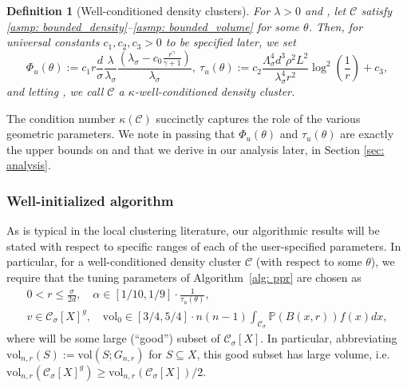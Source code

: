 \documentclass[11pt,twoside]{article}
\newtheorem{definition}{Definition}
\newcommand{\vol}{\mathrm{vol}}
\newcommand{\1}{\mathbf{1}}
\newcommand{\Phibf}{\Phi_{u}}
\newcommand{\taubf}{\tau_{u}}
\newcommand{\Xbf}{X}             %
\newcommand{\Pbb}{\mathbb{P}}
\newcommand{\Cbb}{\mathbb{C}}
\newcommand{\Cset}{\mathcal{C}}
\newcommand{\Csig}{\Cset_{\sigma}}
\begin{document}
\begin{definition}[Well-conditioned density clusters]
  For $\lambda > 0$ and \smash{$\Cset \in \Cbb_f(\lambda)$}, let $\Cset$ satisfy 
  \ref{asmp: bounded_density}--\ref{asmp: bounded_volume} for some
  $\theta$. Then, for universal constants $c_1, c_2, c_3 > 0$ to be specified
  later, we set 
  \begin{equation}
    \label{eqn: condition_number_1}
    \Phibf(\theta) 
    := c_1 r \frac{d}{\sigma} \frac{\lambda}{\lambda_{\sigma}}
    \frac{(\lambda_{\sigma} - c_0 \frac{r^{\gamma}}{\gamma +
        1})}{\lambda_{\sigma}},~  
    \taubf(\theta) := c_2 \frac{\Lambda_{\sigma}^4 d^3 \rho^2
      L^2}{\lambda_{\sigma}^4 r^2} \log^2\left(\frac{1}{r}\right) + c_3,
  \end{equation}
  and letting \smash{$\kappa(\Cset) := \Phi_{u}(\theta) \cdot
    \tau_{u}(\theta)$}, we call $\Cset$ a 
  \emph{$\kappa$-well-conditioned density cluster}.  
\end{definition}
\noindent The condition number 
$\kappa(\Cset)$ succinctly captures the role of the various
geometric parameters. 
We note in passing that $\Phibf(\theta)$ and $\taubf(\theta)$ are exactly the upper bounds 
on \smash{$\Phi(\Csig[\Xbf]; G_{n,r})$} and
\smash{$\tau_{\infty}(G_{n,r}[\Csig[\Xbf]])$} that we derive in our analysis
later, in Section \ref{sec: analysis}. 

\subsubsection{Well-initialized algorithm} As is typical in the local clustering
literature, our algorithmic results will be stated with respect to specific
ranges of each of the user-specified parameters. In particular, for a
well-conditioned density cluster $\Cset$ (with respect to some $\theta$), we
require that the tuning parameters of Algorithm~\ref{alg: ppr} are chosen as
\begin{equation}
\begin{gathered}
\label{eqn: initialization}
0 < r \leq \frac{\sigma}{2d}, \quad 
\alpha \in [1/10, 1/9] \cdot \frac{1}{\taubf(\theta)}, \\
v \in \Csig[\Xbf]^g, \quad
\vol_0 \in [3/4,5/4] \cdot n(n-1) \int_{\Csig} \Pbb(B(x,r)) f(x) dx, 
\end{gathered}
\end{equation}
where \smash{$\Csig[\Xbf]^g \subseteq \Csig[\Xbf]$} will be some large
(``good'') subset of $\Csig[\Xbf]$. In particular, abbreviating $\vol_{n,r}(S)
:= \vol(S; G_{n,r})$ for $S \subseteq \Xbf$, this good subset has large volume, i.e. 
$\vol_{n,r}(\Csig[\Xbf]^g) \geq \vol_{n,r}(\Csig[\Xbf])/2$.  
\end{document}
